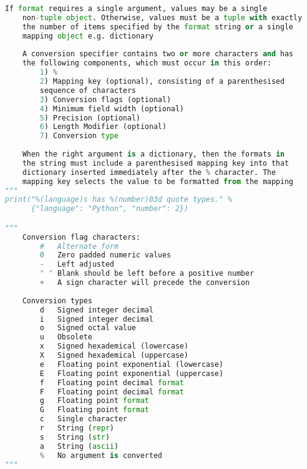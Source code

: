 \documentclass[a4paper,landscape]{report}
\begin{document}
\begin{lstlisting}[language=Python]
    If format requires a single argument, values may be a single
    non-tuple object. Otherwise, values must be a tuple with exactly
    the number of items specified by the format string or a single
    mapping object e.g. dictionary
    
    A conversion specifier contains two or more characters and has
    the following components, which must occur in this order:
        1) %
        2) Mapping key (optional), consisting of a parenthesised 
        sequence of characters
        3) Conversion flags (optional)
        4) Minimum field width (optional)
        5) Precision (optional)
        6) Length Modifier (optional)
        7) Conversion type
        
    When the right argument is a dictionary, then the formats in
    the string must include a parenthesised mapping key into that
    dictionary inserted immediately after the % character. The
    mapping key selects the value to be formatted from the mapping 
"""
print("%(language)s has %(number)03d quote types." %
      {"language": "Python", "number": 2})

"""
    Conversion flag characters:
        #   Alternate form
        0   Zero padded numeric values
        -   Left adjusted
        " " Blank should be left before a positive number
        +   A sign character will precede the conversion
        
    Conversion types
        d   Signed integer decimal
        i   Signed integer decimal
        o   Signed octal value
        u   Obsolete
        x   Signed hexademical (lowercase)
        X   Signed hexademical (uppercase)
        e   Floating point exponential (lowercase)
        E   Floating point exponential (uppercase)
        f   Floating point decimal format
        F   Floating point decimal format
        g   Floating point format
        G   Floating point format
        c   Single character
        r   String (repr)
        s   String (str)
        a   String (ascii)
        %   No argument is converted
"""
\end{lstlisting}
\end{document}
